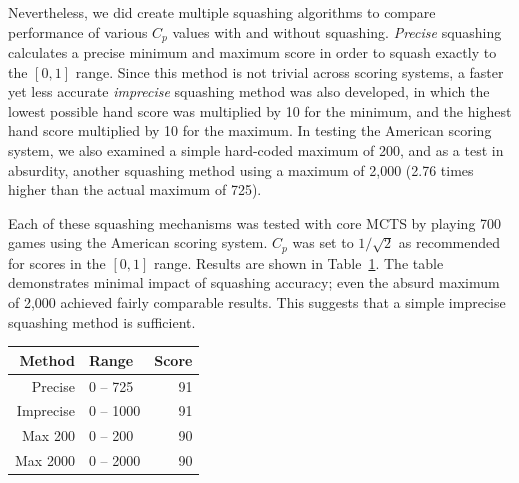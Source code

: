 \documentclass[letterpaper]{article}
\begin{document}
Nevertheless, we did create multiple squashing algorithms to compare performance of various $C_p$ values with and without squashing. {\it Precise} squashing calculates a precise minimum and maximum score in order to squash exactly to the $[0,1]$ range. Since this method is not trivial across scoring systems, a faster yet less accurate {\it imprecise} squashing method was also developed, in which the lowest possible hand score was multiplied by 10 for the minimum, and the highest hand score multiplied by 10 for the maximum. In testing the American scoring system, we also examined a simple hard-coded maximum of 200, and as a test in absurdity, another squashing method using a maximum of 2,000 (2.76 times higher than the actual maximum of 725).

Each of these squashing mechanisms was tested with core MCTS by playing 700 games using the American scoring system. $C_p$ was set to $1 / \sqrt{2}$ as recommended for scores in the $[0,1]$ range. Results are shown in Table~\ref{tbl:Squashing}. The table demonstrates minimal impact of squashing accuracy; even the absurd maximum of 2,000 achieved fairly comparable results. This suggests that a simple imprecise squashing method is sufficient.

\begin{table}
\label{tbl:Squashing}
\centering
\begin{tabular}{r l r}
\hline
{\bf Method} & {\bf Range} & {\bf Score} \\
\hline
Precise & 0 -- 725 & 91 \\
Imprecise & 0 -- 1000 & 91 \\
Max 200 & 0 -- 200 & 90 \\
Max 2000 & 0 -- 2000 & 90 \\
\hline
\end{tabular}
\end{table}

\end{document}
